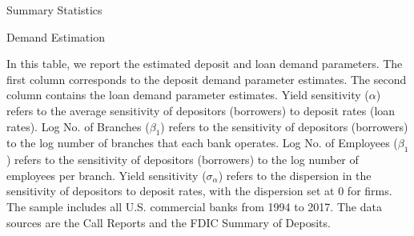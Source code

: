 \documentclass[12pt]{article}
\begin{document}
\clearpage\newpage
\begin{table}[h]
		\caption{Summary Statistics 	\label{tab:sum_stats}}
		\vspace{5mm}
		
		
		
\end{table}



\begin{table}[h]
	\caption{Demand Estimation\label{tab:Demand}}
	\vspace{5mm}
	
	\footnotesize{In this table, we report the estimated deposit and loan demand parameters. The first column corresponds to the deposit demand parameter estimates. The second column contains the loan demand parameter estimates. Yield sensitivity ($\alpha$) refers to the average sensitivity of depositors (borrowers) to deposit rates (loan rates). Log No. of Branches ($\beta_1$) refers to the sensitivity of depositors (borrowers) to the log number of branches that each bank operates. Log No. of Employees ($\beta_1$) refers to the sensitivity of depositors (borrowers) to the log number of employees per branch. Yield sensitivity ($\sigma_\alpha$) refers to the dispersion in the sensitivity of depositors to deposit rates, with the dispersion  set at 0 for firms. The sample includes all U.S. commercial banks from 1994 to 2017. The data sources are the Call Reports and the FDIC Summary of Deposits.\\}
	
	
\end{table}
\end{document}
